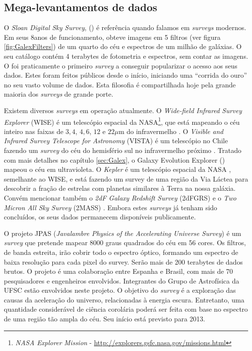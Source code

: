 \subsection{Mega-levantamentos de dados}

O {\em Sloan Digital Sky Survey}, (\SDSS) \citep{York2000} é referência quando
falamos em {\em surveys} modernos. Em seus 8\fixme anos de funcionamento, obteve
imagens em 5 filtros (ver figura \ref{fig:GalexFilters}) de um quarto do céu e
espectros de um milhão de galáxias. O seu catálogo contém 4 terabytes de
fotometria e espectros, sem contar as imagens. O \SDSS foi praticamente o
primeiro {\em survey} a conseguir popularizar o acesso aos seus dados. Estes
foram feitos públicos desde o início\citneed, iniciando uma ``corrida do ouro''
no seu vasto volume de dados. Esta filosofia é compartilhada hoje pela grande
maioria dos {\em surveys} de grande porte.

Existem diversos {\em surveys} em operação atualmente. O {\em Wide-field
Infrared Survey Explorer} (WISE) é um telescópio espacial da NASA\footnote{{\em
NASA Explorer Mission} - \url{http://explorers.gsfc.nasa.gov/missions.html}},
que está mapeando o céu inteiro nas faixas de $3,4$, $4,6$, $12$ e $22\mu$m do
infravermelho \citep{Wright2010}. O {\em Visible and Infrared Survey Telescope
for Astronomy} (VISTA) é um telescópio no Chile fazendo um {\em survey} do céu
do hemisfério sul no infravermelho próximo \citep{Born2010}. Tratado com mais
detalhes no capítulo \ref{sec:Galex}, o {Galaxy Evolution Explorer} (\galex)
mapeou o céu em ultravioleta. O {\em Kepler} é um telescópio espacial da NASA
\citep{Borucki2010}, semelhante ao WISE, e está fazendo um survey de uma região
da Via Láctea para descobrir a fração de estrelas com planetas similares à Terra
na nossa galáxia. Convém mencionar também o {\em 2dF Galaxy Redshift Survey}
(2dFGRS) \citep{Colless1999} e o {\em Two Micron All Sky Survey} (2MASS)
\citep{Skrutskie2006}. Embora estes {\em surveys} já tenham sido concluídos, os
seus dados permanecem disponíveis publicamente.

O projeto JPAS ({\em Javalambre Physics of the Accelerating Universe Survey}) é
um {\em survey} que pretende mapear $8000$ graus quadrados do céu em 56
cores\citep{Benitez2009}. Os filtros, de banda estreita, irão cobrir todo o
espectro óptico, formando um espectro de baixa resolução para cada pixel do
survey. Serão mais de 200 terabytes de dados brutos\citneed. O projeto é uma
colaboração entre Espanha e Brasil, com mais de 70 pesquisadores e engenheiros
envolvidos. Integrantes do Grupo de Astrofísica da UFSC estão envolvidos neste
projeto\citneed. O objetivo do {\em survey} é a exploração das causas da
aceleração do universo, relacionadas à energia escura. Entretanto, uma
quantidade considerável de ciência corolária poderá ser feita com base no
espectro de uma região tão ampla do céu. Seu início está previsto para 2013.

